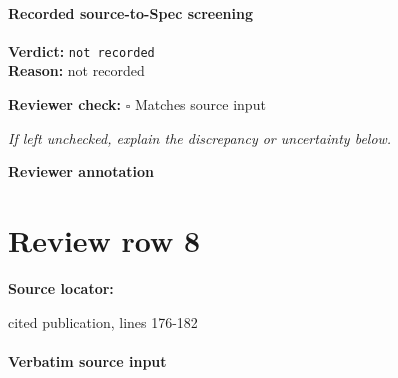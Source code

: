 \documentclass[10pt]{article}
\newcommand{\reviewerbox}{%
  \par\noindent\fbox{\parbox{0.96\linewidth}{\rule{0pt}{0.38in}}}\par
}
\newcommand{\reviewmatch}[1]{%
  \par\noindent\textbf{Reviewer check:} $\square$\; #1\par
  \noindent\emph{If left unchecked, explain the discrepancy or uncertainty below.}\par
}
\begin{document}
\paragraph{Recorded source-to-Spec screening}
\textbf{Verdict:} \texttt{not recorded}
\\
\textbf{Reason:} not recorded
\reviewmatch{Matches source input}
\noindent\textbf{Reviewer annotation}\par
\reviewerbox
\clearpage
\hypertarget{source-claim-f88d6727dfcb8617}{}
\section*{Review row 8}
\textbf{Source locator:} {\footnotesize\raggedright cited publication, lines 176-\allowbreak{}182\par}
\paragraph{Verbatim source input}
\end{document}
